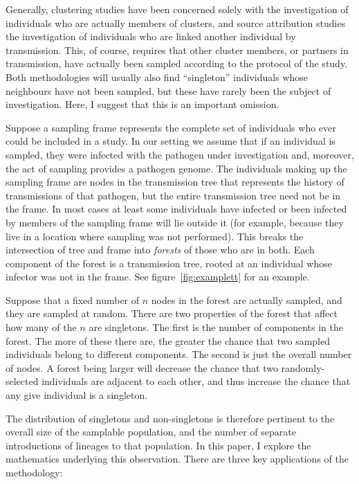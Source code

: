 \documentclass{article}
\begin{document}
Generally, clustering studies have been concerned solely with the investigation of individuals who are actually members of clusters, and source attribution studies the investigation of individuals who are linked another individual by transmission. This, of course, requires that other cluster members, or partners in transmission, have actually been sampled according to the protocol of the study. Both methodologies will usually also find ``singleton'' individuals whose neighbours have not been sampled, but these have rarely been the subject of investigation. Here, I suggest that this is an important omission. 

Suppose a sampling frame represents the complete set of individuals who ever could be included in a study. In our setting we assume that if an individual is sampled, they were infected with the pathogen under investigation and, moreover, the act of sampling provides a pathogen genome. The individuals making up the sampling frame are nodes in the transmission tree that represents the history of  transmissions of that pathogen, but the entire transmission tree need not be in the frame. In most cases at least some individuals have infected or been infected by members of the sampling frame will lie outside it (for example, because they live in a location where sampling was not performed). This breaks the intersection of tree and frame into \emph{forests} of those who are in both. Each component of the forest is a transmission tree, rooted at an individual whose infector was not in the frame. See figure~\ref{fig:examplett} for an example.

Suppose that a fixed number of $n$ nodes in the forest are actually sampled, and they are sampled at random. There are two properties of the forest that affect how many of the $n$ are singletons. The first is the number of components in the forest. The more of these there are, the greater the chance that two sampled individuals belong to different components. The second is just the overall number of nodes. A forest being larger will decrease the chance that two randomly-selected individuals are adjacent to each other, and thus increase the chance that any give individual is a singleton.

The distribution of singletons and non-singletons is therefore pertinent to the overall size of the samplable population, and the number of separate introductions of lineages to that population. In this paper, I explore the mathematics underlying this observation. There are three key applications of the methodology:
\end{document}
